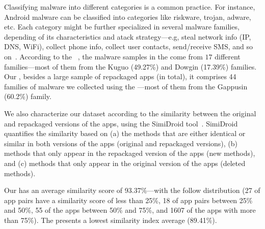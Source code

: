 Classifying malware into different categories is a common practice. For instance, Android malware can be classified into categories
like riskware, trojan, adware, etc. Each category might be further specialized in several malware families, depending of its
characteristics and atack strategy---e.g, steal network info (IP, DNS, WiFi), collect phone info,
collect user contacts, send/receive SMS, and so on~\cite{DBLP:conf/iccns/RahaliLKTGM20}.
According to the
\avt~\cite{avclass2-paper}, the malware samples in the \sds come from $17$ different families---most of them from the Kuguo (49.27\%) and Dowgin (17.39\%) families.
Our \cds, besides a large sample of repackaged apps (\apps in total), it
comprises 44 families of malware we collected using the \avt---most
of them from the Gappusin (60.2\%) family.

We also characterize our dataset according to the similarity
between the original and repackaged versions of the apps, using the  
SimiDroid tool~\cite{DBLP:conf/trustcom/0029BK17}. SimiDroid quantifies the similarity
based on (a) the methods that are either identical or similar in both versions of the apps (original and repackaged versions),
(b) methods that only appear in the repackaged version of the apps (new methods), and (c) methods that only appear in the
original version of the apps (deleted methods).

Our \cds has an average similarity score of 93.37\%---with the follow distribution {\color{red}(27 of
app pairs have a similarity score of less than 25\%, 18 of app pairs
between 25\% and 50\%,  55 of the apps between 50\% and 75\%,
and 1607 of the apps with more than 75\%). The \sds presents a lowest
similarity index average (89.41\%)}. 






